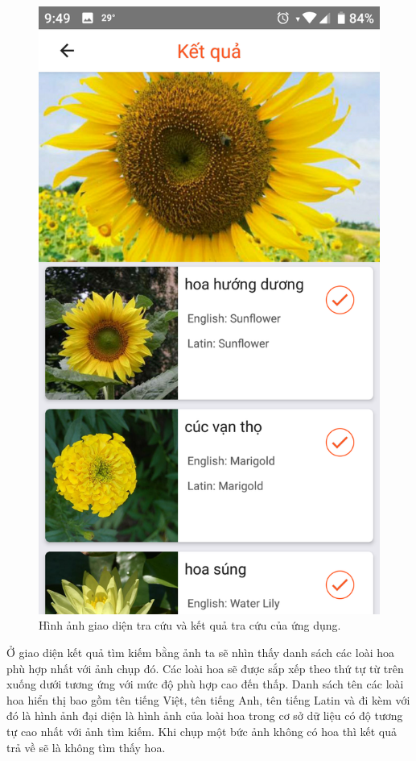 \documentclass[12pt]{report}
\begin{document}
\begin{figure}[h]
			\includegraphics[scale=0.2]{app_search2}
			\caption{Hình ảnh giao diện tra cứu và kết quả tra cứu của ứng dụng.}
			\label{fig:app_search}
		\end{figure}
				
		Ở giao diện kết quả tìm kiếm bằng ảnh ta sẽ nhìn thấy danh sách các loài hoa phù hợp nhất với ảnh chụp đó. Các loài hoa sẽ được sắp xếp theo thứ tự từ trên xuống dưới tương ứng với mức độ phù hợp cao đến thấp. Danh sách tên các loài hoa hiển thị bao gồm tên tiếng Việt, tên tiếng Anh, tên tiếng Latin và đi kèm với đó là hình ảnh đại diện là hình ảnh của loài hoa trong cơ sở dữ liệu có độ tương tự cao nhất với ảnh tìm kiếm. Khi chụp một bức ảnh không có hoa thì kết quả trả về sẽ là không tìm thấy hoa.
				
\end{document}
